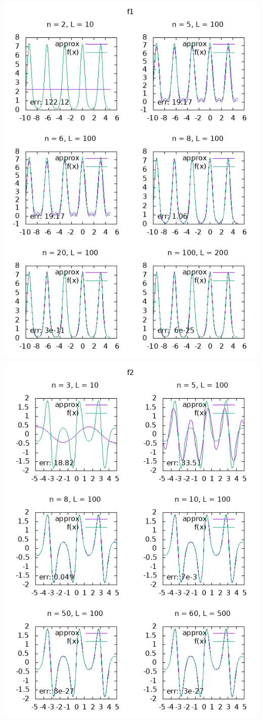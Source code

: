 \documentclass{article}
\begin{document}
\clearpage

\includegraphics{graphs/plot3.png}

\clearpage
\includegraphics{graphs/plot4.png}
 
\end{document}
